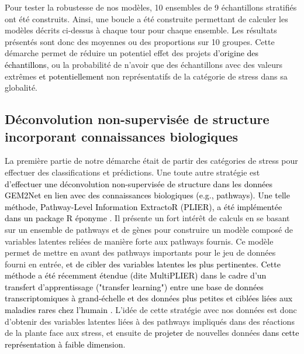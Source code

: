 \documentclass[twoside]{article}
\newcommand{\AR}[1]{\textcolor{black}{#1}}
\begin{document}
    \vspace{0.3cm}Pour tester la robustesse de nos modèles, 10 ensembles de 9 échantillons stratifiés ont été construits. Ainsi, une boucle a été construite permettant de calculer les modèles décrits ci-dessus à chaque tour pour chaque ensemble. Les résultats présentés sont donc des moyennes ou des proportions sur 10 groupes. Cette démarche permet de réduire un potentiel effet des projets \AR{d'origine des échantillons}, ou la probabilité de n'avoir que des échantillons avec des valeurs extrêmes \AR{et potentiellement} non représentatifs de la catégorie de stress dans sa globalité.


    \subsection{Déconvolution non-supervisée de structure  incorporant connaissances biologiques}
    
    La première partie de notre démarche était de partir des catégories de stress pour effectuer des classifications et prédictions. Une toute autre stratégie est \AR{d'effectuer une déconvolution non-supervisée de structure dans les données GEM2Net en lien avec des connaissances biologiques (e.g., pathways). Une telle méthode, Pathway-Level Information ExtractoR (PLIER), a été implémentée dans un package R éponyme} \cite{mao_pathway-level_2019}. Il présente un fort intérêt de calculs en se basant sur un ensemble de pathways et de gènes pour construire un modèle composé de variables latentes reliées de manière forte aux pathways fournis. Ce modèle permet de mettre en avant des pathways importants pour le jeu de données fourni en entrée, \AR{et de cibler des variables latentes les plus pertinentes. Cette méthode a été récemment étendue (dite MultiPLIER) dans le cadre d'un transfert d'apprentissage ("transfer learning") entre une base de données transcriptomiques à grand-échelle et des données plus petites et ciblées liées aux maladies rares chez l'humain \cite{taroni_multiplier_2019}. }
    L'idée de cette stratégie avec nos données est donc d'obtenir des variables latentes liées à des pathways impliqués dans des réactions de la plante face aux stress, et ensuite de \AR{projeter} de nouvelles données \AR{dans cette représentation à faible dimension}.
    
\end{document}
